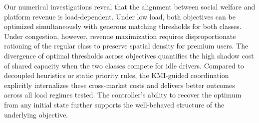 Our numerical investigations reveal that the alignment between social welfare and platform revenue is load-dependent.
Under low load, both objectives can be optimized simultaneously with generous matching thresholds for both classes.
Under congestion, however, revenue maximization requires disproportionate rationing of the regular class to preserve spatial density for premium users.
The divergence of optimal thresholds across objectives quantifies the high shadow cost of shared capacity when the two classes compete for idle drivers.
Compared to decoupled heuristics or static priority rules, the KMI-guided coordination explicitly internalizes these cross-market costs and delivers better outcomes across all load regimes tested.
The controller's ability to recover the optimum from any initial state further supports the well-behaved structure of the underlying objective.

%

